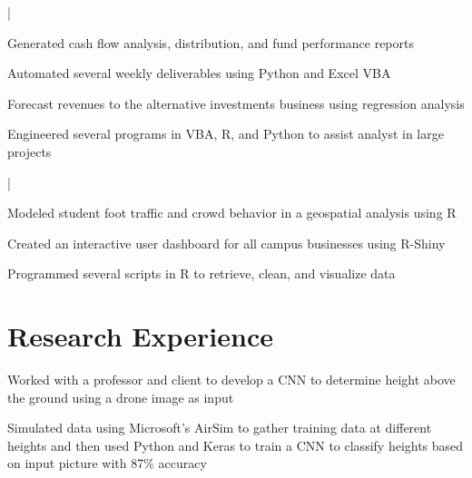 \documentclass[letterpaper]{deedy-resume}
\begin{document}
\begin{minipage}[t]{0.65\textwidth}
\sectionspace 

 |
\begin{tightitemize}
  \item Generated cash flow analysis, distribution, and fund performance reports\\
  \item Automated several weekly deliverables using Python and Excel VBA \\
  \item Forecast revenues to the alternative investments business using regression analysis \\
  \item Engineered several programs in VBA, R, and Python to assist analyst in large projects
\end{tightitemize}

\sectionspace 

 |
\begin{tightitemize}
\item Modeled student foot traffic and crowd behavior in a geospatial analysis using R \\
\item Created an interactive user dashboard for all campus businesses using R-Shiny \\
\item Programmed several scripts in R to retrieve, clean, and visualize data 
\end{tightitemize}

\sectionspace
    
\section{Research Experience}

\begin{tightitemize}
\item Worked with a professor and client to develop a CNN to determine height above the ground using a drone image as input \\
\item Simulated data using Microsoft's AirSim to gather training data at different heights and then used Python and Keras to train a CNN to classify heights based on input picture with 87\% accuracy\\
\end{tightitemize}
\sectionspace 


\end{minipage}
\end{document}
